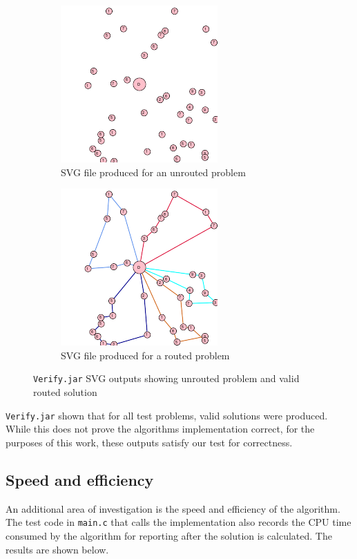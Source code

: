 \documentclass[a4paper]{article}
\begin{document}
        \begin{figure}[h]
            \centering
            \begin{subfigure}{.5\textwidth}
                \centering
                \includegraphics[width=.4\linewidth]{images/40-customers-blank.png}
                \caption{SVG file produced for an unrouted problem}
                \label{fig:sub1}
            \end{subfigure}%
            \begin{subfigure}{.5\textwidth}
                \centering
                \includegraphics[width=.4\linewidth]{images/40-customers-routed.png}
                \caption{SVG file produced for a routed problem}
                \label{fig:sub1}
            \end{subfigure}
            \caption{\texttt{Verify.jar} SVG outputs showing unrouted problem and valid routed solution}
            \label{fig:correctness}
        \end{figure}
        
        \texttt{Verify.jar} shown that for all test problems, valid solutions were produced. While this does not prove the algorithms implementation correct,
        for the purposes of this work, these outputs satisfy our test for correctness.
        
        \subsection{Speed and efficiency}
        An additional area of investigation is the speed and efficiency of the algorithm. The test code in \texttt{main.c} that calls the implementation also
        records the CPU time consumed by the algorithm for reporting after the solution is calculated. The results are shown below.
        
\end{document}
